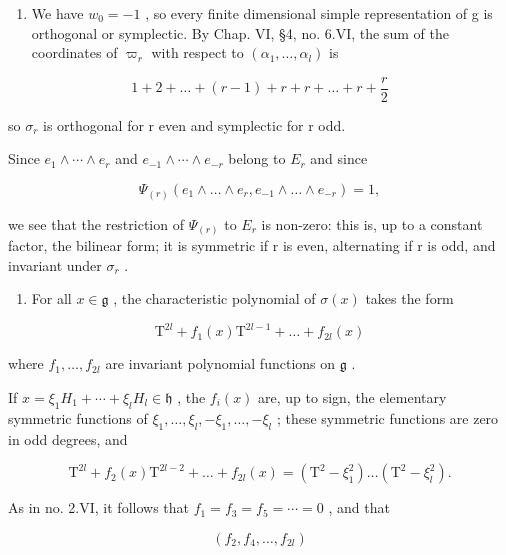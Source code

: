 \begin{enumerate}
\def\labelenumi{(\Alph{enumi})}
\setcounter{enumi}{21}
\tightlist
\item
  We have \(w_{0} = -1\) , so every finite dimensional simple representation of g is orthogonal or symplectic. By Chap. VI, §4, no. 6.VI, the sum of the coordinates of \(\varpi_{r}\) with respect to \((\alpha_{1}, \ldots, \alpha_{l})\) is
\end{enumerate}

\[
1 + 2 + \dots + (r - 1) + r + r + \dots + r + \frac {r}{2}
\]

so \(\sigma_{r}\) is orthogonal for r even and symplectic for r odd.

Since \(e_{1} \wedge \cdots \wedge e_{r}\) and \(e_{-1} \wedge \cdots \wedge e_{-r}\) belong to \(E_{r}\) and since

\[
\Psi_ {(r)} \left(e _ {1} \wedge \dots \wedge e _ {r}, e _ {- 1} \wedge \dots \wedge e _ {- r}\right) = 1,
\]

we see that the restriction of \(\Psi_{(r)}\) to \(E_{r}\) is non-zero: this is, up to a constant factor, the bilinear form; it is symmetric if r is even, alternating if r is odd, and invariant under \(\sigma_{r}\) .

\begin{enumerate}
\def\labelenumi{(\Roman{enumi})}
\setcounter{enumi}{5}
\tightlist
\item
  For all \(x \in \mathfrak{g}\) , the characteristic polynomial of \(\sigma(x)\) takes the form
\end{enumerate}

\[
\mathrm{T} ^ {2 l} + f _ {1} (x) \mathrm{T} ^ {2 l - 1} + \dots + f _ {2 l} (x)
\]

where \(f_{1},\ldots ,f_{2l}\) are invariant polynomial functions on \(\mathfrak{g}\) .

If \(x = \xi_{1}H_{1} + \cdots + \xi_{l}H_{l} \in \mathfrak{h}\) , the \(f_{i}(x)\) are, up to sign, the elementary symmetric functions of \(\xi_{1}, \ldots, \xi_{l}, -\xi_{1}, \ldots, -\xi_{l}\) ; these symmetric functions are zero in odd degrees, and

\[
\mathrm{T} ^ {2 l} + f _ {2} (x) \mathrm{T} ^ {2 l - 2} + \dots + f _ {2 l} (x) = (\mathrm{T} ^ {2} - \xi_ {1} ^ {2}) \ldots (\mathrm{T} ^ {2} - \xi_ {l} ^ {2}).
\]

As in no. 2.VI, it follows that \(f_{1}=f_{3}=f_{5}=\cdots=0\) , and that

\[
(f _ {2}, f _ {4}, \dots , f _ {2 l})
\]

